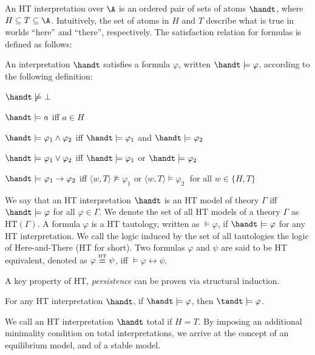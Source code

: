 An HT interpretation over $\A$ is an ordered pair of sets of atoms
$\handt$, where $H \subseteq T \subseteq \A$. Intuitively, the set of
atoms in $H$ and $T$ describe what is true in worlds ``here'' and
``there'', respectively. The satisfaction relation for formulas is
defined as follows:

\begin{definition}[HT satisfaction]
    An interpretation $\handt$ satisfies a formula $\varphi$, written $\handt \models \varphi$, according to the following definition:
    \begin{description}
        \item $\handt \not \models \bot$
        \item $\handt \models a$ iff $a\in H$
        \item $\handt \models \varphi_1 \wedge \varphi_2$ iff $\handt \models \varphi_1$ and  $\handt \models \varphi_2$
        \item $\handt \models \varphi_1 \vee \varphi_2$ iff $\handt \models \varphi_1$ or  $\handt \models \varphi_2$
        \item $\handt \models \varphi_1 \to \varphi_2$ iff $\langle w,T \rangle \not \models \varphi_1$ or  $\langle w,T \rangle \models \varphi_2\;$ for all
        $w \in \{H,T\}$
    \end{description}
\end{definition}

We say that an HT interpretation $\handt$ is an HT model of theory
$\Gamma$ iff $\handt \models \varphi$ for all $\varphi \in \Gamma$. We
denote the set of all HT models of a theory $\Gamma$ as
$\text{HT}(\Gamma)$. A formula $\varphi$ is a HT tautology, written as
$\models \varphi$, if $\handt \models \varphi$ for any HT
interpretation. We call the logic induced by the set of all
tautologies the logic of Here-and-There (HT for short). Two formulas
$\varphi$ and $\psi$ are said to be HT equivalent, denoted as
$\varphi \stackrel{\normalfont\mbox{\tiny HT}}{\equiv} \psi$, iff $\models \varphi \leftrightarrow \psi$.

A key property of HT, \textit{persistence} can be proven via
structural induction.

\begin{proposition}[Persistence]
  For any HT interpretation $\handt$, if $\handt \models \varphi$,
  then $\tandt \models \varphi$.
\end{proposition}

We call an HT interpretation $\handt$ total if $H=T$. By imposing an
additional minimality condition on total interpretations, we arrive at
the concept of an equilibrium model, and of a stable model.

